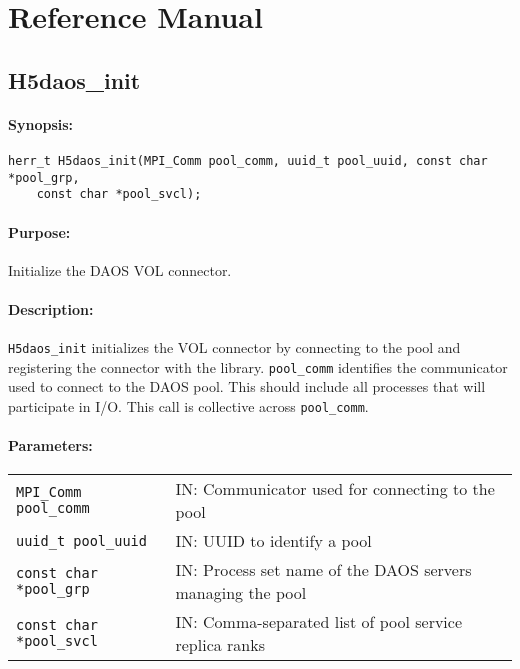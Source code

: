 \documentclass[../users_guide.tex]{subfiles}
\begin{document}
\section{Reference Manual}
\label{apdx:ref_manual}

\subsection{H5daos\_init}
\label{ref:h5daos_init}

\paragraph{Synopsis:}
\begin{flushleft}%
\begin{verbatim}
herr_t H5daos_init(MPI_Comm pool_comm, uuid_t pool_uuid, const char *pool_grp,
    const char *pool_svcl);
\end{verbatim}
\end{flushleft}%

\paragraph{Purpose:}
\begin{flushleft}%
Initialize the DAOS VOL connector.
\end{flushleft}%

\paragraph{Description:}
\begin{flushleft}%
\texttt{H5daos\_init} initializes the VOL connector by connecting to the pool
and registering the connector with the library. \texttt{pool\_comm}
identifies the communicator used to connect to the DAOS pool.  This should
include all processes that will participate in I/O. This call is collective
across \texttt{pool\_comm}.
\end{flushleft}%

\paragraph{Parameters:}
\begin{flushleft}%
 \begin{tabular}{ll}%
   \texttt{MPI\_Comm pool\_comm} & IN: Communicator used for connecting to the pool \\
   \texttt{uuid\_t pool\_uuid} & IN: UUID to identify a pool \\
   \texttt{const char *pool\_grp} & IN: Process set name of the DAOS servers managing the pool \\
   \texttt{const char *pool\_svcl} & IN: Comma-separated list of pool service replica ranks \\
 \end{tabular}%
\end{flushleft}%
\end{document}
